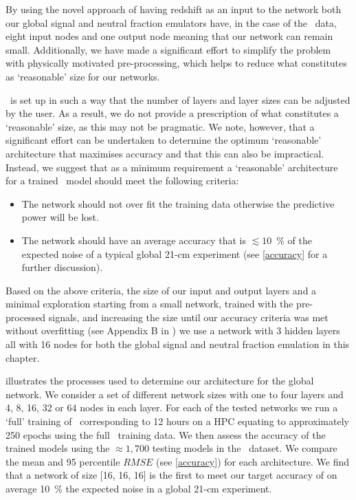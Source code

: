 By using the novel approach of having redshift as an input to the network both our global signal and neutral fraction emulators have, in the case of the \cmGEM~data, eight input nodes and one output node meaning that our network can remain small. Additionally, we have made a significant effort to simplify the problem with physically motivated pre-processing, which helps to reduce what constitutes as `reasonable' size for our networks.

\name~is set up in such a way that the number of layers and layer sizes can be adjusted by the user. As a result, we do not provide a prescription of what constitutes a `reasonable' size, as this may not be pragmatic. We note, however, that a significant effort can be undertaken to determine the optimum `reasonable' architecture that maximises accuracy and that this can also be impractical. Instead, we suggest that as a minimum requirement a `reasonable' architecture for a trained \name~model should meet the following criteria:
\begin{itemize}
    \item The network should not over fit the training data otherwise the predictive power will be lost.
    \item The network should have an average accuracy that is $\lesssim 10$~\% of the expected noise of a typical global 21-cm experiment (see \cref{accuracy} for a further discussion).
\end{itemize}

Based on the above criteria, the size of our input and output layers and a minimal exploration starting from a small network, trained with the pre-processed signals, and increasing the size until our accuracy criteria was met without overfitting (see Appendix B in \cite{Bevins_globalemu_2021}) we use a network with 3 hidden layers all with 16 nodes for both the global signal and neutral fraction emulation in this chapter.

 illustrates the processes used to determine our architecture for the global network. We consider a set of different network sizes with one to four layers and 4, 8, 16, 32 or 64 nodes in each layer. For each of the tested networks we run a `full' training of \name~corresponding to 12 hours on a HPC equating to approximately 250 epochs using the full \cmGEM~training data. We then assess the accuracy of the trained models using the $\approx1,700$ testing models in the \cmGEM~dataset. We compare the mean and 95 percentile $RMSE$ (see \cref{accuracy}) for each architecture. We find that a network of size [16, 16, 16] is the first to meet our target accuracy of on average 10~\% the expected noise in a global 21-cm experiment. 

